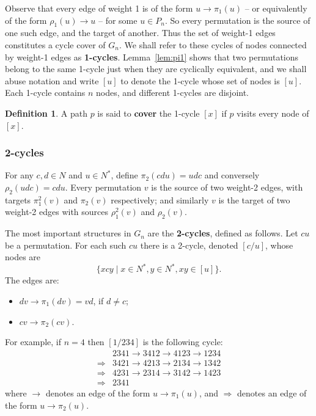\documentclass[a4paper]{article}
\theoremstyle{definition}
\newtheorem{defn}{Definition}[section]
\theoremstyle{remark}
\let\definiendum\textbf
\begin{document}
Observe that every edge of weight 1 is of the form $u\to\pi_1(u)$ -- or equivalently of the form $\rho_1(u)\to u$ -- for some $u\in P_n$. So every permutation is the source of one such edge, and the target of another. Thus the set of weight-1 edges constitutes a cycle cover of $G_n$. We shall refer to these cycles of nodes connected by weight-1 edges as \definiendum{1-cycles}. Lemma~\ref{lem:pi1} shows that two permutations belong to the same 1-cycle just when they are cyclically equivalent, and we shall abuse notation and write $[u]$ to denote the 1-cycle whose set of nodes is $[u]$. Each 1-cycle contains $n$ nodes, and different 1-cycles are disjoint.

\begin{defn}\label{def:covers}
    A path $p$ is said to \definiendum{cover} the 1-cycle $[x]$ if $p$ visits every node of $[x]$.
\end{defn}

\subsubsection{2-cycles}
For any $c, d\in N$ and $u\in N^*$, define $\pi_2(cdu) = udc$ and conversely $\rho_2(udc)=cdu$.
Every permutation $v$ is the source of two weight-2 edges, with targets $\pi_1^2(v)$ and $\pi_2(v)$ respectively; and similarly $v$ is the target of two weight-2 edges with sources $\rho_1^2(v)$ and $\rho_2(v)$.

The most important structures in $G_n$ are the \definiendum{2-cycles}, defined as follows. Let $cu$ be a permutation. For each such $cu$ there is a 2-cycle, denoted $[c/u]$, whose nodes are
\[
    \{ xcy \;|\; x\in N^*, y\in N^*, xy \in [u] \}.
\]
The edges are:
\begin{itemize}
    \item $dv\to\pi_1(dv) = vd$, if $d\ne c$;
    \item $cv\to\pi_2(cv)$.
\end{itemize}

\let\To\Rightarrow
For example, if $n=4$ then $[1/234]$ is the following cycle:
\begin{align*}
    &2341 \to 3412 \to 4123 \to 1234\\
    \To{} &3421 \to 4213 \to 2134 \to 1342\\
    \To{} &4231 \to 2314 \to 3142 \to 1423\\
    \To{} &2341
\end{align*}
where $\to$ denotes an edge of the form $u\to\pi_1(u)$, and $\To$ denotes an edge of the form $u\to\pi_2(u)$.
\end{document}
